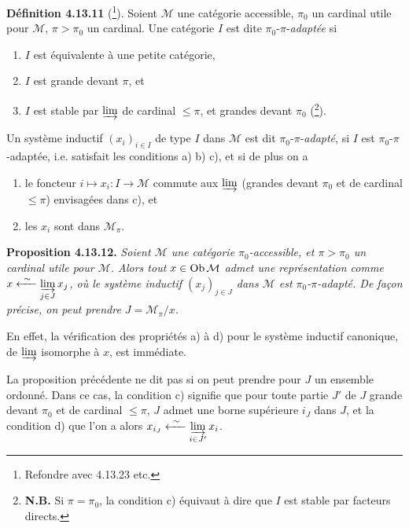 
\noindent\textbf{Définition 4.13.11} (\footnote[132]{Refondre avec 4.13.23 etc.}). Soient $\mathcal{M}$ une catégorie accessible, $\pi_0$ un cardinal utile pour $\mathcal{M}$, $\pi > \pi_0$ un cardinal. Une catégorie $I$ est dite $\pi_0$-$\pi$-\textit{adaptée} si
\begin{enumerate}
\item[a)] $I$ est équivalente à une petite catégorie,
\item[b)] $I$ est grande devant $\pi$, et
\item[c)] $I$ est stable par $\varinjlim$ de cardinal $\leqslant \pi$, et grandes devant $\pi_0$ (\footnote[133]{\textbf{N.B.} Si $\pi = \pi_0$, la condition c) équivaut à dire que $I$ est stable par facteurs directs.}).
\end{enumerate}
\noindent Un système inductif $(x_i)_{i\in I}$ de type $I$ dans $\mathcal{M}$ est dit $\pi_0$-$\pi$-\textit{adapté}, si $I$ est $\pi_0$-$\pi$-adaptée, i.e. satisfait les conditions a) b) c), et si de plus on a
\begin{enumerate}
\item[d)] le foncteur $i \longmapsto x_i : I \longrightarrow \mathcal{M}$ commute aux $\varinjlim$ (grandes devant $\pi_0$ et de cardinal $\leqslant \pi$) envisagées dans c), et
\item[e)] les $x_i$ sont dans $\mathcal{M}_\pi$.
\end{enumerate}

\noindent\textbf{Proposition 4.13.12.} \textit{Soient $\mathcal{M}$ une catégorie $\pi_0$-accessible, et $\pi > \pi_0$ un cardinal utile pour $\mathcal{M}$. Alors tout $x \in \operatorname{Ob}\mathcal{M}$ admet une représentation comme $x \xleftarrow{\ \sim\ } \ilim_{j\in J} x_j$, où le système inductif $(x_j)_{j\in J}$ dans $\mathcal{M}$ est $\pi_0$-$\pi$-adapté. De façon précise, on peut prendre $J = \mathcal{M}_\pi/x$.}

\noindent En effet, la vérification des propriétés a) à d) pour le système inductif canonique, de $\varinjlim$ isomorphe à $x$, est immédiate.

La proposition précédente ne dit pas si on peut prendre pour $J$ un ensemble ordonné. Dans ce cas, la condition c) signifie que pour toute partie $J'$ de $J$ grande devant $\pi_0$ et de cardinal $\leqslant \pi$, $J$ admet une borne supérieure $i_J$ dans $J$, et la condition d) que l'on a alors $x_{i_J} \xleftarrow{\ \sim\ } \varinjlim\limits_{i\in J'} x_i$.

